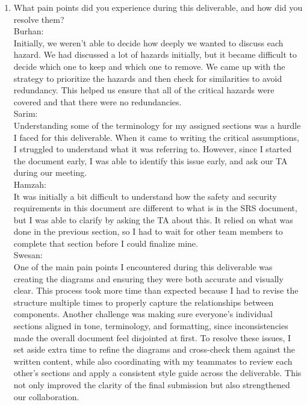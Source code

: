 \documentclass{article}
\begin{document}
\begin{enumerate}
    \item What pain points did you experience during this deliverable, and how
    did you resolve them?\\

    Burhan: \\
    Initially, we weren't able to decide how deeply we wanted to discuss each hazard. We had discussed a lot of hazards initially, but it became difficult to decide which one to keep and which one to remove. We came up with the strategy to prioritize the hazards and then check for similarities to avoid redundancy. This helped us ensure that all of the critical hazards were covered and that there were no redundancies.  \\    
Sarim: \\
Understanding some of the terminology for my assigned sections was a hurdle I faced for this deliverable. When it came to writing the critical assumptions, I struggled to understand what it was referring to. However, since I started the document early, I was able to identify this issue early, and ask our TA during our meeting.
\\    
Hamzah: \\
It was initially a bit difficult to understand how the safety and security requirements in this document are different to what is in the SRS document, but I was able to clarify by asking the TA about this. It relied on what was done in the previous section, so I had to wait for other team members to complete that section before I could finalize mine. 
\\   
Swesan: \\
One of the main pain points I encountered during this deliverable was creating the diagrams and ensuring they were both accurate and visually clear. This process took more time than expected because I had to revise the structure multiple times to properly capture the relationships between components. Another challenge was making sure everyone's individual sections aligned in tone, terminology, and formatting, since inconsistencies made the overall document feel disjointed at first. To resolve these issues, I set aside extra time to refine the diagrams and cross-check them against the written content, while also coordinating with my teammates to review each other's sections and apply a consistent style guide across the deliverable. This not only improved the clarity of the final submission but also strengthened our collaboration. 
\\


\end{enumerate}
\end{document}
